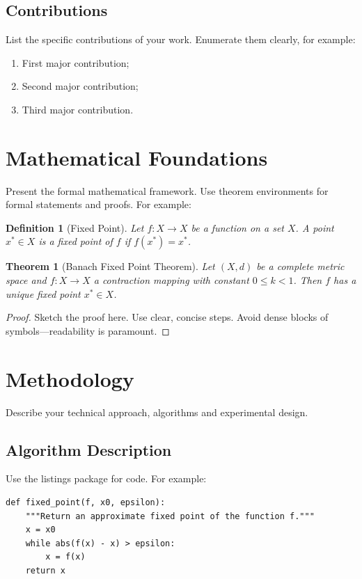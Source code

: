 \documentclass[11pt,letterpaper]{article}
\newtheorem{theorem}{Theorem}[section]
\newtheorem{definition}{Definition}[section]
\begin{document}
\subsection{Contributions}
List the specific contributions of your work.  Enumerate them clearly,
for example:
\begin{enumerate}
    \item First major contribution;
    \item Second major contribution;
    \item Third major contribution.
\end{enumerate}

\section{Mathematical Foundations}
Present the formal mathematical framework.  Use theorem environments
for formal statements and proofs.  For example:

\begin{definition}[Fixed Point]
Let $f : X \to X$ be a function on a set $X$.  A point $x^* \in X$ is a
\emph{fixed point} of $f$ if $f(x^*) = x^*$.
\end{definition}

\begin{theorem}[Banach Fixed Point Theorem]
Let $(X,d)$ be a complete metric space and $f : X \to X$ a contraction
mapping with constant $0 \le k < 1$.  Then $f$ has a unique fixed point
$x^* \in X$.
\end{theorem}

\begin{proof}
Sketch the proof here.  Use clear, concise steps.  Avoid dense blocks of
symbols—readability is paramount.
\end{proof}

\section{Methodology}
Describe your technical approach, algorithms and experimental design.

\subsection{Algorithm Description}
Use the listings package for code.  For example:

\begin{lstlisting}[style=somnus, caption={Fixed point iteration example}, label=lst:fixedpoint]
def fixed_point(f, x0, epsilon):
    """Return an approximate fixed point of the function f."""
    x = x0
    while abs(f(x) - x) > epsilon:
        x = f(x)
    return x
\end{lstlisting}
\end{document}
